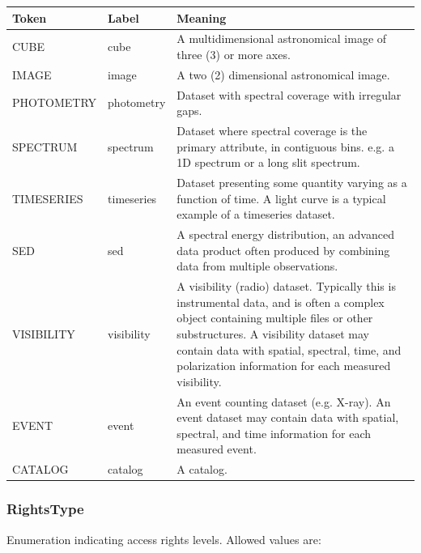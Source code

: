   \begin{table}[h!]
    \small
    \centering
    \renewcommand{\arraystretch}{1.5}
    \begin{tabular}{|p{1.25in}|p{0.75in}|p{3.5in}|}
      \hline 
           \textbf{Token} & \textbf{Label} & \textbf{Meaning}\\
      \hline  
      \hline  
      CUBE       & cube       &  A multidimensional astronomical image of three (3) or more axes. \\
      \hline  
      IMAGE      & image      &  A two (2) dimensional astronomical image. \\
      \hline  
      PHOTOMETRY & photometry &  Dataset with spectral coverage with irregular gaps. \\
      \hline  
      SPECTRUM   & spectrum   &  Dataset where spectral coverage is the primary attribute, in contiguous bins. e.g. a 1D spectrum or a long slit spectrum. \\
      \hline  
      TIMESERIES & timeseries &  Dataset presenting some quantity varying as a function of time. A light curve is a typical example of a timeseries dataset. \\
      \hline  
      SED        & sed        &  A spectral energy distribution, an advanced data product often produced by combining data from multiple observations. \\
      \hline  
      VISIBILITY & visibility &  A visibility (radio) dataset. Typically this is instrumental data, and is often a complex object containing multiple files or other substructures. A visibility dataset may contain data with spatial, spectral, time, and polarization information for each measured visibility. \\
      \hline  
      EVENT      & event      &  An event counting dataset (e.g. X-ray). An event dataset may contain data with spatial, spectral, and time information for each measured event. \\
      \hline  
      CATALOG    & catalog    &  A catalog. \\
      \hline 
    \end{tabular}
  \end{table}

  \subsubsection{RightsType}
  \label{sect:rights}
  Enumeration indicating access rights levels. Allowed values are:

